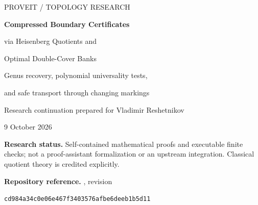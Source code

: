 \documentclass[11pt,letterpaper]{article}
\theoremstyle{definition}
\theoremstyle{remark}
\newcommand{\code}[1]{\texttt{\detokenize{#1}}}
\newcommand{\pin}{\texttt{cd984a34c0e06e467f3403576afbe6deeb1b5d11}}
\begin{document}
\hypersetup{pageanchor=false}
\begin{titlepage}
\vspace*{0.4in}
{\large\sffamily PROVEIT \quad / \quad TOPOLOGY RESEARCH}\par
\vspace{0.35in}
{\LARGE\bfseries Compressed Boundary Certificates\par}
\vspace{0.12in}
{\Large via Heisenberg Quotients and\par Optimal Double-Cover Banks\par}
\vspace{0.3in}
{\large Genus recovery, polynomial universality tests,\par and safe transport through changing markings}\par
\vspace{0.3in}
Research continuation prepared for Vladimir Reshetnikov\par
9 October 2026\par
\vspace{0.25in}
\begin{abstract}
We develop an exact local primitive for the hierarchy route to unknot recognition: classification of a supplied, source-verified simple boundary curve represented by a straight-line program, without expanding its word. A classical finite quotient of Livingston and Pikaart becomes a small compiler carrying $2g$ modular homology coordinates and one central coordinate. The central coordinate recovers the unordered complementary genera of a separating curve. Evaluation costs $O(Sg\log^2(g+1))$ bit operations for encoded program size $S$.

Our main structural result characterizes every fixed family of double covers that detects all essential separating simple curves. The span of the characters must be coisotropic, and an explicitly constructed interaction graph must be connected. This gives a polynomial universality test and proves that exactly $g+1$ covers are necessary and sufficient. A Lagrangian basis together with its sum attains the bound. We also prove a transport contract, exhibit the failure of the smaller even-genus quotient under a Dehn twist, and give an independent cellular/Magnus interpretation of the cover tests.

The package includes exact code, independent dense-matrix replay, 47 unit tests, exhaustive low-genus audits, and paired local timings. It does not construct the source curve, certify its embeddedness, or bound the global hierarchy search. No general quasi-polynomial unknot-recognition theorem or native-runtime speedup is claimed.
\end{abstract}
\vfill
\noindent\textbf{Research status.} Self-contained mathematical proofs and executable finite checks; not a proof-assistant formalization or an upstream integration. Classical quotient theory is credited explicitly.\par
\smallskip
\noindent\textbf{Repository reference.} \code{Topology/UnknotRecognition}, revision\par
\noindent\pin
\end{titlepage}
\end{document}
